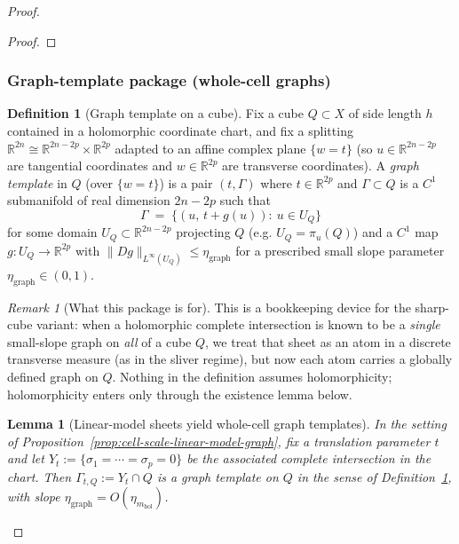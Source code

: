 \documentclass[11pt]{article}
\numberwithin{equation}{section}  %
\theoremstyle{plain}
\newtheorem{lemma}[theorem]{Lemma}
\theoremstyle{definition}
\newtheorem{definition}[theorem]{Definition}
\theoremstyle{remark}
\newtheorem{remark}[theorem]{Remark}
\newcommand{\R}{\mathbb{R}}
\newcommand{\mhol}{m_{\mathrm{hol}}} %
\begin{document}
\begin{proof}
\begin{proof}
\end{proof}





\subsubsection*{Graph-template package (whole-cell graphs)}
%
\begin{definition}[Graph template on a cube]\label{def:graph-template}
Fix a cube $Q\subset X$ of side length $h$ contained in a holomorphic coordinate chart, and fix a splitting
$\R^{2n}\cong \R^{2n-2p}\times \R^{2p}$ adapted to an affine complex plane $\{w=t\}$ (so $u\in\R^{2n-2p}$ are tangential coordinates and
$w\in\R^{2p}$ are transverse coordinates).
A \emph{graph template} in $Q$ (over $\{w=t\}$) is a pair $(t,\Gamma)$ where $t\in\R^{2p}$ and $\Gamma\subset Q$ is a $C^1$ submanifold
of real dimension $2n-2p$ such that
\[
\Gamma\;=\;\{(u,\,t+g(u)):\ u\in U_Q\}
\]
for some domain $U_Q\subset \R^{2n-2p}$ projecting $Q$ (e.g. $U_Q=\pi_u(Q)$) and a $C^1$ map $g:U_Q\to \R^{2p}$ with
$\|Dg\|_{L^\infty(U_Q)}\le \eta_{\mathrm{graph}}$ for a prescribed small slope parameter $\eta_{\mathrm{graph}}\in(0,1)$.
\end{definition}


%
\begin{remark}[What this package is for]\label{rem:graph-template-remark}
This is a bookkeeping device for the sharp-cube variant: when a holomorphic complete intersection is known to be a \emph{single} small-slope
graph on \emph{all} of a cube $Q$, we treat that sheet as an atom in a discrete transverse measure (as in the sliver regime), but now each atom
carries a globally defined graph on $Q$.
Nothing in the definition assumes holomorphicity; holomorphicity enters only through the existence lemma below.
\end{remark}


%
\begin{lemma}[Linear-model sheets yield whole-cell graph templates]\label{lem:graph-template-exists}
In the setting of Proposition~\ref{prop:cell-scale-linear-model-graph}, fix a translation parameter $t$ and let
$Y_t:=\{\sigma_1=\cdots=\sigma_p=0\}$ be the associated complete intersection in the chart. Then
$\Gamma_{t,Q}:=Y_t\cap Q$ is a graph template on $Q$ in the sense of Definition~\ref{def:graph-template}, with slope
$\eta_{\mathrm{graph}}=O(\eta_{\mhol})$.
\end{lemma}


\end{proof}
\end{document}
